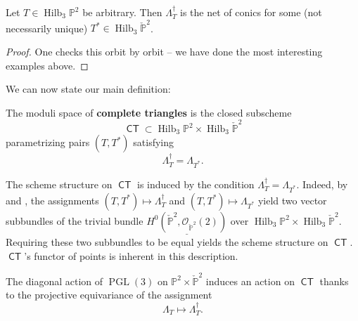 \documentclass{article}
\renewcommand{\P}{\mathbb{P}}
\DeclareMathOperator{\PGL}{PGL}
\DeclareMathOperator{\Hilb}{Hilb}
\renewcommand{\O}{\mathcal{O}}
\DeclareMathOperator{\CT}{\mathsf{CT}}
\begin{document}
\begin{proposition} Let $T \in \Hilb_{3}\P^{2}$ be arbitrary. Then $\Lambda_{T}^{\dagger}$ is the net of conics for some (not
    necessarily unique) $T^{*} \in \Hilb_{3}\check{\P}^{2}$.

\end{proposition}
\begin{proof}
  One checks this orbit by orbit -- we have done the most interesting examples above.  
\end{proof}




We can now state our main definition:

\begin{definition}\label{def:CT}
  The moduli space of {\bf complete triangles} is the closed subscheme
  $$\CT \subset \Hilb_{3}\P^{2} \times \Hilb_{3}\check{\P}^{2}$$ parametrizing
  pairs $(T, T^{*})$ satisfying
  \[\Lambda_{T}^{\dagger} = \Lambda_{T^{*}}.\]
\end{definition}

\begin{remark}
  The scheme structure on $\CT$ is induced by the condition
  $\Lambda_{T}^{\dagger} = \Lambda_{T^{*}}.$ Indeed, by
   and
  , the assignments
  $(T, T^{*}) \mapsto \Lambda_{T}^{\dagger}$ and
  $(T, T^{*}) \mapsto \Lambda_{T^{*}}$ yield two vector subbundles of
  the trivial bundle $\underline{H^{0}(\check{\P}^{2}, \O_{\check{\P}^{2}}(2))}$
  over $\Hilb_{3}\P^{2} \times \Hilb_{3}\check{\P}^{2}$.  Requiring these two subbundles to be equal yields the scheme structure on
  $\CT$. $\CT$'s functor of points is inherent in this description.
\end{remark}





The diagonal action of $\PGL(3)$ on $\P^{2} \times \check{\P}^{2}$ induces an action on $\CT$  thanks to the projective equivariance of the assignment
\[\Lambda_{T} \mapsto \Lambda_{T}^{\dagger}.\] 
\end{document}
